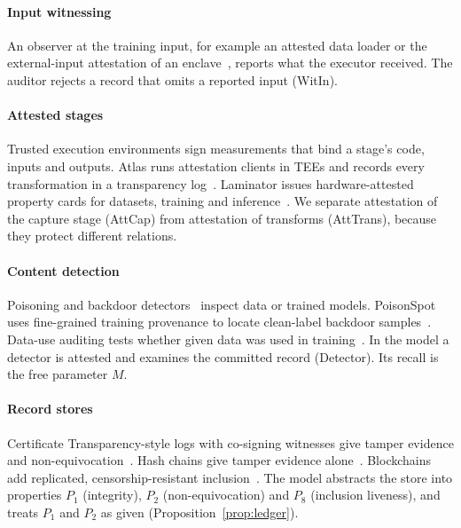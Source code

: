 \paragraph{Input witnessing}
An observer at the training input, for example an attested data loader or the
external-input attestation of an enclave~\cite{huang2026exia}, reports what the executor
received. The auditor rejects a record that omits a reported input (\textsf{WitIn}).

\paragraph{Attested stages}
Trusted execution environments sign measurements that bind a stage's code, inputs and
outputs. Atlas runs attestation clients in TEEs and records every transformation in a
transparency log~\cite{spoczynski2025atlas}. Laminator issues hardware-attested property
cards for datasets, training and inference~\cite{duddu2025laminator}. We separate
attestation of the capture stage (\textsf{AttCap}) from attestation of transforms
(\textsf{AttTrans}), because they protect different relations.

\paragraph{Content detection}
Poisoning and backdoor detectors~\cite{goldblum2023dataset,tran2018spectral} inspect data
or trained models. PoisonSpot uses fine-grained training provenance to locate clean-label
backdoor samples~\cite{hailemariam2025poisonspot}. Data-use auditing tests whether given
data was used in training~\cite{huang2024datause,chen2025anonymity}. In the model a
detector is attested and examines the committed record (\textsf{Detector}). Its recall is
the free parameter $M$.

\paragraph{Record stores}
Certificate Transparency-style logs with co-signing witnesses give tamper evidence and
non-equivocation~\cite{rfc6962}. Hash chains give tamper evidence alone~\cite{li2025auditablellm}.
Blockchains add replicated, censorship-resistant inclusion~\cite{geren2025blockchain,mehammed2025fl}.
The model abstracts the store into properties $P_1$ (integrity), $P_2$ (non-equivocation)
and $P_8$ (inclusion liveness), and treats $P_1$ and $P_2$ as given
(Proposition~\ref{prop:ledger}).

